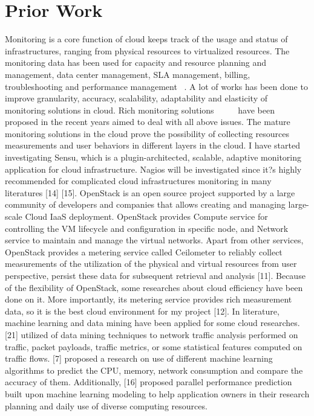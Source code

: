 

\section{Prior Work}
\label{sec:PriorWork}

Monitoring is a core function of cloud keeps track of the usage and status of infrastructures, ranging from physical resources to virtualized resources. The monitoring data has been used for capacity and resource planning and management, data center management, SLA management, billing, troubleshooting and performance management ~\cite{Aceto2013}. A lot of works has been done to improve granularity, accuracy, scalability, adaptability and elasticity of monitoring solutions in cloud. Rich monitoring solutions ~\cite{Alcaraz2015} ~\cite{Jesus2013} ~\cite{Javier2013} have been proposed in the recent years aimed to deal with all above issues. The mature monitoring solutions in the cloud prove the possibility of collecting resources measurements and user behaviors in different layers in the cloud. I have started investigating Sensu, which is a plugin-architected, scalable, adaptive monitoring application for cloud infrastructure. Nagios will be investigated since it?s highly recommended for complicated cloud infrastructures monitoring in many literatures [14] [15].
OpenStack is an open source project supported by a large community of developers and companies that allows creating and managing large-scale Cloud IaaS deployment. OpenStack provides Compute service for controlling the VM lifecycle and configuration in specific node, and Network service to maintain and manage the virtual networks. Apart from other services, OpenStack provides a metering service called Ceilometer to reliably collect measurements of the utilization of the physical and virtual resources from user perspective, persist these data for subsequent retrieval and analysis [11]. Because of the flexibility of OpenStack, some researches about cloud efficiency have been done on it. More importantly, its metering service provides rich measurement data, so it is the best cloud environment for my project [12].
In literature, machine learning and data mining have been applied for some cloud researches. [21] utilized of data mining techniques to network traffic analysis performed on traffic, packet payloads, traffic metrics, or some statistical features computed on traffic flows. [7] proposed a research on use of different machine learning algorithms to predict the CPU, memory, network consumption and compare the accuracy of them. Additionally, [16]  proposed parallel performance prediction built upon machine learning modeling to help application owners in their research planning and daily use of diverse computing resources. 
